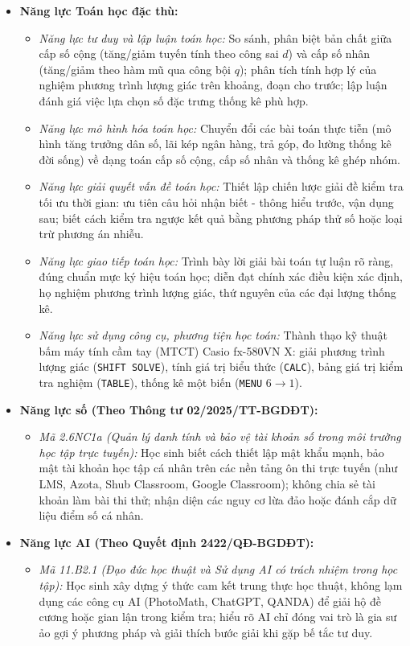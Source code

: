 \documentclass[12pt, a4paper]{article}
\begin{document}
\begin{itemize}[leftmargin=1.2cm]
    \item \textbf{Năng lực Toán học đặc thù:}
    \begin{itemize}[leftmargin=0.6cm]
        \item \textit{Năng lực tư duy và lập luận toán học:} So sánh, phân biệt bản chất giữa cấp số cộng (tăng/giảm tuyến tính theo công sai $d$) và cấp số nhân (tăng/giảm theo hàm mũ qua công bội $q$); phân tích tính hợp lý của nghiệm phương trình lượng giác trên khoảng, đoạn cho trước; lập luận đánh giá việc lựa chọn số đặc trưng thống kê phù hợp.
        \item \textit{Năng lực mô hình hóa toán học:} Chuyển đổi các bài toán thực tiễn (mô hình tăng trưởng dân số, lãi kép ngân hàng, trả góp, đo lường thống kê đời sống) về dạng toán cấp số cộng, cấp số nhân và thống kê ghép nhóm.
        \item \textit{Năng lực giải quyết vấn đề toán học:} Thiết lập chiến lược giải đề kiểm tra tối ưu thời gian: ưu tiên câu hỏi nhận biết - thông hiểu trước, vận dụng sau; biết cách kiểm tra ngược kết quả bằng phương pháp thử số hoặc loại trừ phương án nhiễu.
        \item \textit{Năng lực giao tiếp toán học:} Trình bày lời giải bài toán tự luận rõ ràng, đúng chuẩn mực ký hiệu toán học; diễn đạt chính xác điều kiện xác định, họ nghiệm phương trình lượng giác, thứ nguyên của các đại lượng thống kê.
        \item \textit{Năng lực sử dụng công cụ, phương tiện học toán:} Thành thạo kỹ thuật bấm máy tính cầm tay (MTCT) Casio fx-580VN X: giải phương trình lượng giác (\texttt{SHIFT SOLVE}), tính giá trị biểu thức (\texttt{CALC}), bảng giá trị kiểm tra nghiệm (\texttt{TABLE}), thống kê một biến (\texttt{MENU} $6 \to 1$).
    \end{itemize}

    \item \textbf{Năng lực số (Theo Thông tư 02/2025/TT-BGDĐT):}
    \begin{itemize}[leftmargin=0.6cm]
        \item \textit{Mã 2.6NC1a (Quản lý danh tính và bảo vệ tài khoản số trong môi trường học tập trực tuyến):} Học sinh biết cách thiết lập mật khẩu mạnh, bảo mật tài khoản học tập cá nhân trên các nền tảng ôn thi trực tuyến (như LMS, Azota, Shub Classroom, Google Classroom); không chia sẻ tài khoản làm bài thi thử; nhận diện các nguy cơ lừa đảo hoặc đánh cắp dữ liệu điểm số cá nhân.
    \end{itemize}

    \item \textbf{Năng lực AI (Theo Quyết định 2422/QĐ-BGDĐT):}
    \begin{itemize}[leftmargin=0.6cm]
        \item \textit{Mã 11.B2.1 (Đạo đức học thuật và Sử dụng AI có trách nhiệm trong học tập):} Học sinh xây dựng ý thức cam kết trung thực học thuật, không lạm dụng các công cụ AI (PhotoMath, ChatGPT, QANDA) để giải hộ đề cương hoặc gian lận trong kiểm tra; hiểu rõ AI chỉ đóng vai trò là gia sư ảo gợi ý phương pháp và giải thích bước giải khi gặp bế tắc tư duy.
    \end{itemize}


\end{itemize}
\end{document}
